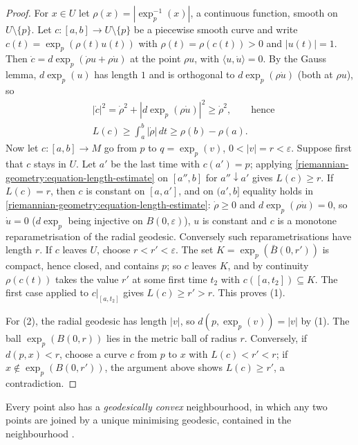 \begin{proof}
For $x \in U$ let $\rho(x) = |\exp_p^{-1}(x)|$, a continuous function, smooth on $U \setminus \{p\}$. Let $c \colon [a, b] \to U \setminus \{p\}$ be a piecewise smooth curve and write $c(t) = \exp_p(\rho(t)u(t))$ with $\rho(t) = \rho(c(t)) > 0$ and $|u(t)| = 1$.
Then $\dot c = d\exp_p(\dot\rho u + \rho\dot u)$ at the point $\rho u$, with $\langle u, \dot u\rangle = 0$. By the Gauss lemma, $d\exp_p(u)$ has length $1$ and is orthogonal to $d\exp_p(\rho\dot u)$ (both at $\rho u$), so
\begin{equation}\label{riemannian-geometry:equation-length-estimate}
\begin{aligned}
&|\dot c|^2 = \dot\rho^2 + |d\exp_p(\rho\dot u)|^2 \geq \dot\rho^2, \qquad\text{hence}\\
&L(c) \geq \int_a^b|\dot\rho|\,dt \geq \rho(b) - \rho(a).
\end{aligned}
\end{equation}
Now let $c \colon [a, b] \to M$ go from $p$ to $q = \exp_p(v)$, $0 < |v| = r < \varepsilon$. Suppose first that $c$ stays in $U$. Let $a'$ be the last time with $c(a') = p$; applying \eqref{riemannian-geometry:equation-length-estimate} on $[a'', b]$ for $a'' \downarrow a'$ gives $L(c) \geq r$. If
$L(c) = r$, then $c$ is constant on $[a, a']$, and on $(a', b]$ equality holds in \eqref{riemannian-geometry:equation-length-estimate}: $\dot\rho \geq 0$ and $d\exp_p(\rho\dot u) = 0$, so $\dot u = 0$ ($d\exp_p$ being injective on $B(0, \varepsilon)$), $u$ is constant and $c$ is a monotone
reparametrisation of the radial geodesic. Conversely such reparametrisations have length $r$. If $c$ leaves $U$, choose $r < r' < \varepsilon$. The set $K = \exp_p(\bar B(0, r'))$ is compact, hence closed, and contains $p$; so $c$
leaves $K$, and by continuity $\rho(c(t))$ takes the value $r'$ at some first time $t_2$ with $c([a, t_2]) \subseteq K$. The first case applied to $c|_{[a, t_2]}$ gives $L(c) \geq r' > r$. This proves (1).

For (2), the radial geodesic has length $|v|$, so $d(p, \exp_p(v)) = |v|$ by (1). The ball $\exp_p(B(0, r))$ lies in the metric ball of radius $r$. Conversely, if $d(p, x) < r$, choose a curve $c$ from $p$ to $x$ with $L(c) < r' < r$; if
$x \notin \exp_p(B(0, r'))$, the argument above shows $L(c) \geq r'$, a contradiction.
\end{proof}

\begin{remark}\label{riemannian-geometry:remark-convex}
Every point also has a \emph{geodesically convex} neighbourhood, in which any two points are joined by a unique minimising geodesic, contained in the neighbourhood \cite[Chapter 3]{do-carmo-riemannian}.
\end{remark}


